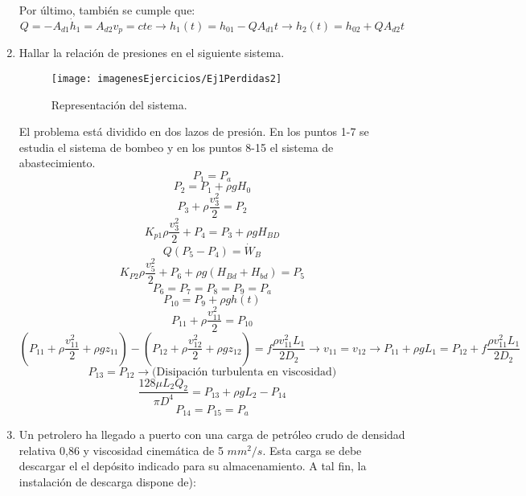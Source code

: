 \begin{enumerate}
	
	Por último, también se cumple que:
	\[Q=-A_{d1}\dot{h}_1=A_{d2} v_p = cte\rightarrow h_1(t)=h_{01}-QA_{d1}t \rightarrow h_2(t)=h_{02}+QA_{d2}t\]
	\black
	\item Hallar la relación de presiones en el siguiente sistema.
		
	\begin{figure}[H]
		\centering
		\texttt{[image: imagenesEjercicios/Ej1Perdidas2]}
		\caption{Representación del sistema.}
		\label{fig:ej1perdidas2}
	\end{figure}
	\blue
	El problema está dividido en dos lazos de presión. En los puntos 1-7 se estudia el sistema de bombeo y en los puntos 8-15 el sistema de abastecimiento.
	\[P_1=P_a\]
	\[P_2=P_1+\rho g H_0\]
	\[P_3+\rho \dfrac{v_3^2}{2}=P_2\]
	\[K_{p1}\rho \dfrac{v_3^2}{2} + P_4=P_3+\rho g H_{BD}\]
	\[Q(P_5-P_4)=\dot{W}_B\]
	\[K_{P2}\rho \dfrac{v_5^2}{2}+P_6+\rho g(H_{Bd}+H_{bd})=P_5\]
	\[P_6=P_7=P_8=P_9=P_a\]
	\[P_{10}=P_9+\rho g h(t)\]
	\[P_{11}+\rho\dfrac{v_{11}^2}{2}=P_{10}\]
	\[ \left(P_{11}+\rho\dfrac{v_{11}^2}{2}+\rho g z_{11}\right)-\left(P_{12}+\rho\dfrac{v_{12}^2}{2}+\rho g z_{12} \right)=f
	\dfrac{\rho v_{11}^2 L_1}{2D_2}\rightarrow v_{11}=v_{12} \rightarrow P_{11} +\rho g L_1=P_{12}+f
	\dfrac{\rho v_{11}^2 L_1}{2D_2}\]
	\[P_{13}=P_{12} \rightarrow \text{(Disipación turbulenta en viscosidad)}\]
	\[\dfrac{128\mu L_2 Q_2}{\pi D^4}=P_{13}+\rho g L_2 - P_{14}\]
	\[P_{14}=P_{15}=P_a\]
	\black
	
	
	\item Un petrolero ha llegado a puerto con una carga de petróleo crudo de densidad relativa 0,86
	y viscosidad cinemática de 5 $mm^2/s$. Esta carga se debe descargar el el depósito indicado
	para su almacenamiento. A tal fin, la instalación de descarga dispone de):
	

\end{enumerate}
